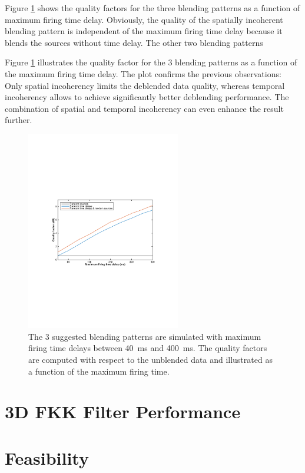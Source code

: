 Figure \ref{fig:Ch-Results-QualityFactors} shows the quality factors for the three blending patterns as a function of maximum firing time delay. Obviously, the quality of the spatially incoherent blending pattern is independent of the maximum firing time delay because it blends the sources without time delay. The other two blending patterns 



Figure \ref{fig:Ch-Results-QualityFactors} illustrates the quality factor for the 3 blending patterns as a function of the maximum firing time delay. The plot confirms the previous observations: Only spatial incoherency limits the deblended data quality, whereas temporal incoherency allows to achieve significantly better deblending performance. The combination of spatial and temporal incoherency can even enhance the result further.

\begin{figure}
	\centering
	\includegraphics[width = 0.6\textwidth]{Plots/BlendingPatterns/quality_line_plot_avg}
	\caption{The 3 suggested blending patterns are simulated with maximum firing time delays between \SI{40}{\milli\second} and \SI{400}{\milli\second}. The quality factors are computed with respect to the unblended data and illustrated as a function of the maximum firing time.}
	\label{fig:Ch-Results-QualityFactors}
\end{figure}

\FloatBarrier
\section{3D FKK Filter Performance}

\section{Feasibility}








